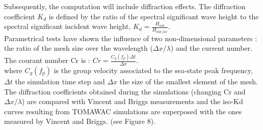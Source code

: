 Subsequently, the computation will include diffraction effects.
The diffraction coefficient $K_d$ is defined by the ratio of the spectral significant wave height to the spectral significant incident wave height, $K_d = \frac{H_{m0}}{H_{m0\_ inc}}$.\\
Parametrical tests have shown the influence of two non-dimensional parameters : the ratio of the mesh size over the wavelength ($\Delta x / \lambda$) and the current number.
The courant number Cr is : $Cr = \frac{C_g(f_p)\Delta t}{\Delta x}$.\\
where $C_g(f_p)$ is the group velocity associated to the sea-state peak frequency, $\Delta t$ the simulation time step and $\Delta x$ the size of the smallest element of the mesh.\\ 
The diffraction coefficients obtained during the simulations (changing Cr and $\Delta x / \lambda $) are compared with Vincent and Briggs measurements and the iso-Kd curves resulting from TOMAWAC simulations are superposed with the ones measured by Vincent and Briggs. (see Figure 8). 


